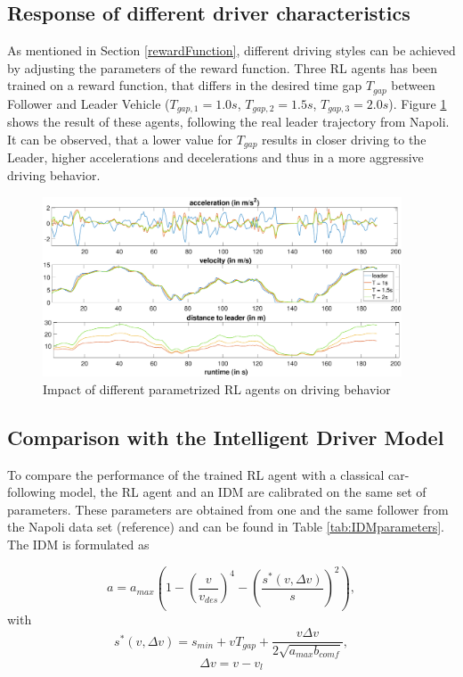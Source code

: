\documentclass[review]{elsarticle}
\begin{document}
\subsection{Response of different driver characteristics}
\label{sec:differentT}

As mentioned in Section \ref{rewardFunction}, different driving styles can be achieved by adjusting the parameters of the reward function. Three RL agents has been trained on a reward function, that differs in the desired time gap $T_{gap}$ between Follower and Leader Vehicle ($T_{gap,1} = 1.0s$, $T_{gap,2} = 1.5s$, $T_{gap,3} = 2.0s$). Figure \ref{fig:differentT} shows the result of these agents, following the real leader trajectory from Napoli. It can be observed, that a lower value for $T_{gap}$ results in closer driving to the Leader, higher accelerations and decelerations and thus in a more aggressive driving behavior. 

\begin{figure}
	\centering
	\includegraphics[width=0.95\textwidth]{images/differentT}
	\caption{Impact of different parametrized RL agents on driving behavior}
	\label{fig:differentT}
\end{figure}


\subsection{Comparison with the Intelligent Driver Model}
To compare the performance of the trained RL agent with a classical car-following model, the RL agent and an IDM are calibrated on the same set of parameters. These parameters are obtained from one and the same follower from the Napoli data set (reference) and can be found in Table \ref{tab:IDMparameters}. The IDM is formulated as 

\begin{equation}
a=a_{max}\left(1-\left(\frac{v}{v_{des}}\right)^{4}-\left(\frac{s^{*}\left(v, \Delta v\right)}{s}\right)^{2}\right),
\end{equation}
with
\begin{equation}
s^{*}\left(v, \Delta v\right)=s_{min}+vT_{gap}+\frac{v \Delta v}{2 \sqrt{a_{max} b_{comf}}},
\end{equation}
\begin{equation}
\Delta v = v-v_l
\end{equation}
\end{document}
